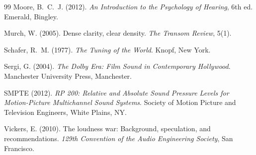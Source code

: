 \begin{thebibliography}{99}
Moore, B.~C.~J. (2012). \emph{An Introduction to the Psychology of Hearing}, 6th ed. Emerald, Bingley.

Murch, W. (2005). Dense clarity, clear density. \emph{The Transom Review}, 5(1).

Schafer, R.~M. (1977). \emph{The Tuning of the World}. Knopf, New York.

Sergi, G. (2004). \emph{The Dolby Era: Film Sound in Contemporary Hollywood}. Manchester University Press, Manchester.

SMPTE (2012). \emph{RP 200: Relative and Absolute Sound Pressure Levels for Motion-Picture Multichannel Sound Systems}. Society of Motion Picture and Television Engineers, White Plains, NY.

Vickers, E. (2010). The loudness war: Background, speculation, and recommendations. \emph{129th Convention of the Audio Engineering Society}, San Francisco.

\end{thebibliography}
